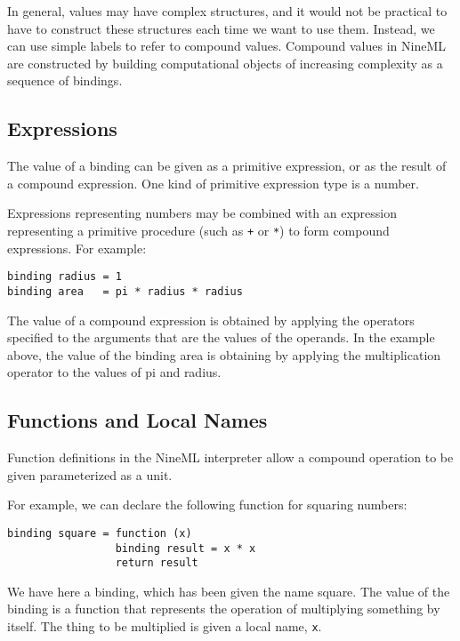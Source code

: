 \documentclass[10pt]{article}
\begin{document}
In general, values may have complex structures, and it would not
be practical to have to construct these structures each time we want
to use them. Instead, we can use simple labels to refer to compound
values. Compound values in NineML are constructed by building
computational objects of increasing complexity as a sequence of
bindings. 

\subsection*{Expressions}
The value of a binding can be given as a primitive expression, or
as the result of a compound expression. One kind of primitive
expression type is a number. 

Expressions representing numbers may be combined with an
expression representing a primitive procedure (such as \texttt{+}
or \texttt{*}) to form compound expressions. For example: \begin{center}
{\small{}\begin{verbatim}
binding radius = 1
binding area   = pi * radius * radius
\end{verbatim}
}\end{center}


The value of a compound expression is obtained by applying the
operators specified to the arguments that are the values of the
operands. In the example above, the value of the binding area is
obtaining by applying the multiplication operator to the values of pi
and radius. 

\subsection*{Functions and Local Names}
Function definitions in the NineML interpreter allow a compound
operation to be given parameterized as a unit. 

For example, we can declare the following function for squaring
numbers: \begin{center}
{\small{}\begin{verbatim}
binding square = function (x)
                 binding result = x * x
                 return result
\end{verbatim}
}\end{center}


We have here a binding, which has been given the name square. The
value of the binding is a function that represents the operation of
multiplying something by itself. The thing to be multiplied is given a
local name, \texttt{x}. 
\end{document}
